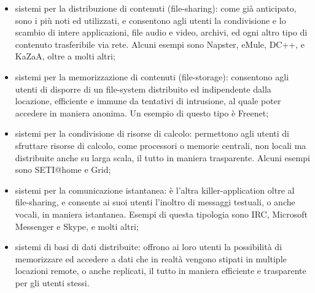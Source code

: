 \begin{itemize}
\item sistemi per la distribuzione di contenuti (file-sharing): come già anticipato, sono i più noti ed utilizzati, e consentono agli utenti la condivisione e lo scambio di 	intere applicazioni, file audio e video, archivi, ed ogni altro tipo di contenuto trasferibile via rete. Alcuni esempi sono Napster, eMule, DC++, e KaZaA, oltre a molti altri;
\item sistemi per la memorizzazione di contenuti (file-storage): consentono agli utenti di disporre di un file-system distribuito ed indipendente dalla locazione, efficiente e immune da tentativi di intrusione, al quale poter accedere in maniera anonima. Un esempio di questo tipo è Freenet;
\item sistemi per la condivisione di risorse di calcolo: permettono agli utenti di sfruttare risorse di calcolo, come processori o memorie centrali, non locali ma distribuite anche su larga scala, il tutto in maniera trasparente. Alcuni esempi sono SETI@home e Grid;
\item sistemi per la comunicazione istantanea: è l’altra killer-application oltre al file-sharing, e consente ai suoi utenti l’inoltro di messaggi testuali, o anche vocali, in maniera istantanea. Esempi di questa tipologia sono IRC, Microsoft Messenger e Skype, e 	molti altri;
\item sistemi di basi di dati distribuite: offrono ai loro utenti la possibilità di memorizzare ed accedere a dati che in realtà vengono stipati in multiple locazioni remote, o anche replicati, il tutto in maniera efficiente e trasparente per gli utenti stessi.
\end{itemize}
